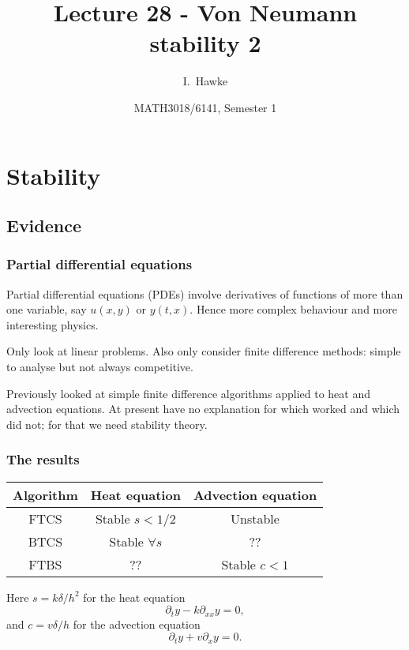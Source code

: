 \documentclass{beamer}
\title[Lecture 28] %
{Lecture 28 - Von Neumann stability 2}
\author[I. Hawke] %
{I.~Hawke}
\institute[University of Southampton] %
{
  School of Mathematics, \\
  University of Southampton, UK
}
\date[Semester 1] %
{MATH3018/6141, Semester 1}
\begin{document}
\begin{frame}
  \titlepage
\end{frame}

\section{Stability}

\subsection{Evidence}

\begin{frame}
  \frametitle{Partial differential equations}

  Partial differential equations (PDEs) involve derivatives of
  functions of more than one variable, say $u(x, y)$ or $y(t,
  x)$. Hence more complex behaviour and more interesting
  physics. \pause

  \vspace{1ex}

  Only look at linear problems.  Also only consider finite difference
  methods: simple to analyse but not always competitive. \pause

  \vspace{1ex}

  Previously looked at simple finite difference algorithms applied to
  heat and advection equations. At present have no explanation for
  which worked and which did not; for that we need stability theory.

\end{frame}

\begin{frame}
  \frametitle{The results}

  \begin{center}
    \begin{tabular}{c|c c}
      Algorithm & Heat equation & Advection equation \\ \hline
      FTCS & Stable $s < 1/2$ & Unstable \\
      BTCS & Stable $\forall s$ & ?? \\
      FTBS & ?? & Stable $c < 1$
    \end{tabular}
  \end{center}

  Here $s = k \delta / h^2$ for the heat equation
  \begin{equation*}
    \partial_t y - k \partial_{x x} y = 0,
  \end{equation*}
  and $c = v \delta / h$ for the advection equation
  \begin{equation*}
    \partial_t y + v \partial_x y = 0.
  \end{equation*}

\end{frame}
\end{document}
